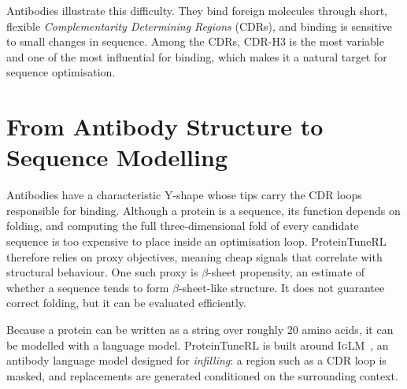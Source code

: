 \documentclass[11pt]{article}
\newcommand{\iglm}{\textsc{IgLM}}
\begin{document}
Antibodies illustrate this difficulty. They bind foreign molecules through short,
flexible \emph{Complementarity Determining Regions} (CDRs), and binding is
sensitive to small changes in sequence. Among the CDRs, CDR-H3 is the most
variable and one of the most influential for binding, which makes it a natural
target for sequence optimisation.

\section{From Antibody Structure to Sequence Modelling}
Antibodies have a characteristic Y-shape whose tips carry the CDR loops
responsible for binding. Although a protein is a sequence, its function depends on
folding, and computing the full three-dimensional fold of every candidate
sequence is too expensive to place inside an optimisation loop. ProteinTuneRL
therefore relies on proxy objectives, meaning cheap signals that correlate with
structural behaviour. One such proxy is $\beta$-sheet propensity, an estimate of
whether a sequence tends to form $\beta$-sheet-like structure. It does not
guarantee correct folding, but it can be evaluated efficiently.

Because a protein can be written as a string over roughly 20 amino acids, it can
be modelled with a language model. ProteinTuneRL is built around
\iglm~\cite{iglm}, an antibody language model designed for \emph{infilling}: a
region such as a CDR loop is masked, and replacements are generated conditioned on
the surrounding context.
\end{document}
